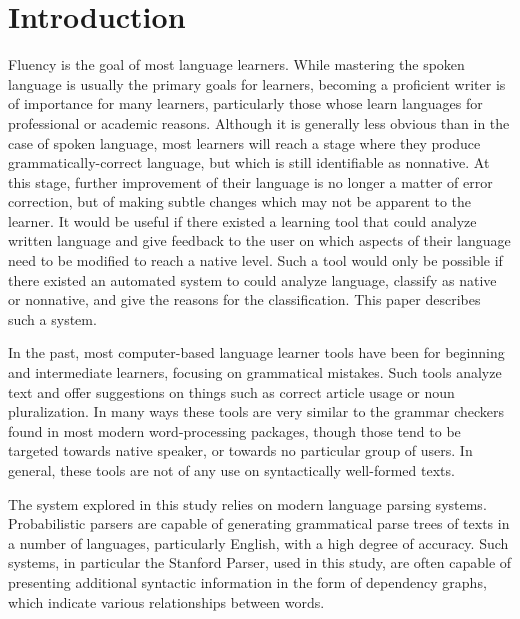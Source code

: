\documentclass[main.tex]{subfiles}
\begin{document}
\section{Introduction}

Fluency is the goal of most language learners. While mastering the spoken language is usually the primary goals for learners, becoming a proficient writer is of importance for many learners, particularly those whose learn languages for professional or academic reasons. Although it is generally less obvious than in the case of spoken language, most learners will reach a stage where they produce grammatically-correct language, but which is still identifiable as nonnative. At this stage, further improvement of their language is no longer a matter of error correction, but of making subtle changes which may not be apparent to the learner. It would be useful if there existed a learning tool that could analyze written language and give feedback to the user on which aspects of their language need to be modified to reach a native level. Such a tool would only be possible if there existed an automated system to could analyze language, classify as native or nonnative, and give the reasons for the classification. This paper describes such a system.

In the past, most computer-based language learner tools have been for beginning and intermediate learners, focusing on grammatical mistakes. Such tools analyze text and offer suggestions on things such as correct article usage or noun pluralization. In many ways these tools are very similar to the grammar checkers found in most modern word-processing packages, though those tend to be targeted towards native speaker, or towards no particular group of users. In general, these tools are not of any use on syntactically well-formed texts.

\begin{comment}
The classification of text documents is a fairly mature technology, often used in categorizing medical and business documents. Little work has been done in applying this technology to second language learning.
\end{comment}

The system explored in this study relies on modern language parsing systems. Probabilistic parsers are capable of generating grammatical parse trees of texts in a number of languages, particularly English, with a high degree of accuracy. Such systems, in particular the Stanford Parser, used in this study, are often capable of presenting additional syntactic information in the form of dependency graphs, which indicate various relationships between words.
\end{document}
